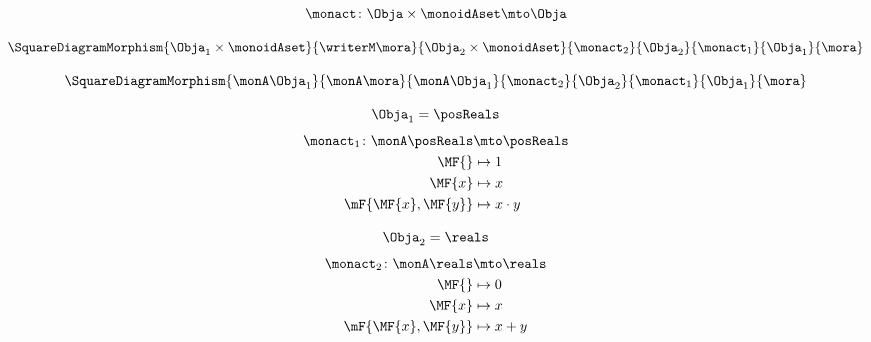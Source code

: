{\begin{forslides}
    \begin{equation}\label{eq:writer-algebras}
        \monact \colon \Obja \times \monoidAset \mto \Obja
    \end{equation}

    \begin{equation}\label{eq:writer-algebra-morphism-square-domain}
        \SquareDiagramMorphism{
            \Obja_1 \times \monoidAset
        }{
            \writerM \mora
        }{
            \Obja_2 \times \monoidAset
        }{
            \monact_2
        }{
            \Obja_2
        }{
            \monact_1
        }{
            \Obja_1
        }{
            \mora
        }
    \end{equation}

    \begin{equation}\label{eq:formal-algebra-morphism-square-domain}
        \SquareDiagramMorphism{
            \monA \Obja_1
        }{
            \monA \mora
        }{
            \monA \Obja_1
        }{
            \monact_2
        }{
            \Obja_2
        }{
            \monact_1
        }{
            \Obja_1
        }{
            \mora
        }
    \end{equation}

    \begin{equation}\label{eq:formal-algebra-morphism-square-1-x}
        \Obja_1 = \posReals
    \end{equation}
    \begin{equation}\label{eq:formal-algebra-morphism-square-1-a}
        \begin{aligned}
            \monact_1 \colon \monA \posReals & \mto \posReals \\
            \MF{}                            & \mapsto 1 \\
            \MF{x}                           & \mapsto x \\
            \mF{\MF{x}, \MF{y}}              & \mapsto x \cdot y
        \end{aligned}
    \end{equation}

    \begin{equation}\label{eq:formal-algebra-morphism-square-2-x}
        \Obja_2 = \reals
    \end{equation}
    \begin{equation}\label{eq:formal-algebra-morphism-square-2-a}
        \begin{aligned}
            \monact_2 \colon \monA \reals & \mto \reals \\
            \MF{}                         & \mapsto 0 \\
            \MF{x}                        & \mapsto x \\
            \mF{\MF{x}, \MF{y}}           & \mapsto x + y
        \end{aligned}
    \end{equation}


\end{forslides}}
